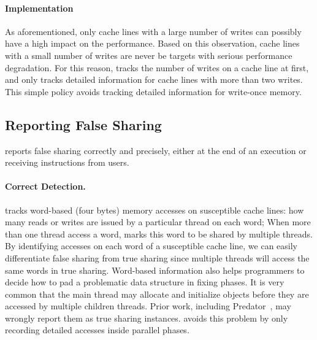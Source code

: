
\paragraph{Implementation} 
As aforementioned, only cache lines with a large number of writes can possibly have a high impact on the performance. Based on this observation, cache lines with a small number of writes are never be targets with serious performance degradation. For this reason, \Cheetah{} tracks the number of writes on a cache line at first, and only tracks detailed information for cache lines with more than two writes. This simple policy avoids tracking detailed information for write-once memory. 

 \subsection{Reporting False Sharing}
\label{sec:report}

\Cheetah{} reports false sharing correctly and precisely, either at the end of an execution or receiving instructions from users.  

\paragraph{Correct Detection.} \Cheetah{} tracks word-based (four bytes) memory accesses on susceptible cache lines: how many reads or writes are issued by a particular thread on each word; When more than one thread access a word, \Cheetah{} marks this word to be shared by multiple threads. By identifying accesses on each word of a susceptible cache line, we can easily differentiate false sharing from true sharing since multiple threads will access the same words in true sharing. Word-based information also helps programmers to decide how to pad a problematic data structure in fixing phases. It is very common that the main thread  may allocate and initialize objects before they are accessed by multiple children threads. Prior work, including Predator~\cite{Predator}, may wrongly report them as true sharing instances. \cheetah{} avoids this problem by only recording detailed accesses inside parallel phases.

